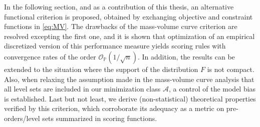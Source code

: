 







In the following section, and as a contribution of this thesis, an alternative functional criterion is proposed, obtained by exchanging objective and constraint functions in \eqref{eq:MV}. The drawbacks of the mass-volume curve criterion are resolved excepting the first one, and it is shown that optimization of an empirical discretized version of this performance measure yields scoring rules with convergence rates of the order $\mathcal{O}_{\mathbb{P}}(1/\sqrt{n})$. In addition, the results can be extended to the situation where the support of the distribution $F$ is not compact. Also, when relaxing the assumption made in the mass-volume curve analysis that all level sets are included in our minimization class $\mathcal{A}$, a control of the model bias is established. Last but not least, we derive (non-statistical) theoretical properties verified by this criterion, which corroborate its adequacy as a metric on pre-orders/level sets summarized in scoring functions.


